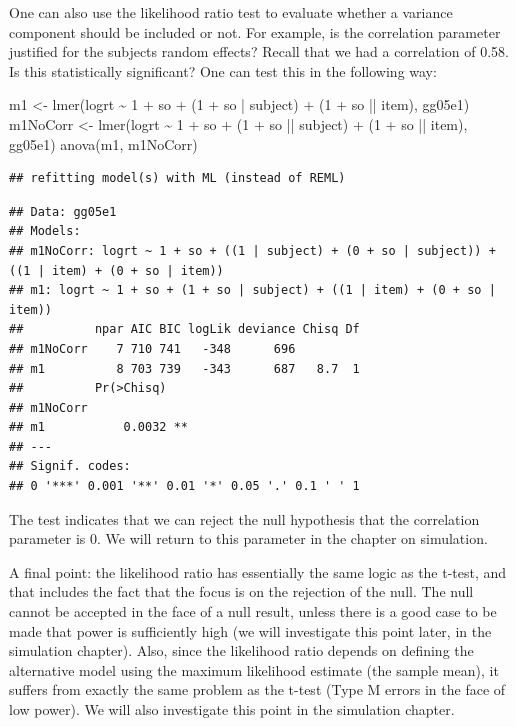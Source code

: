 \documentclass[
  12pt,
]{krantz}
\newenvironment{Shaded}{\begin{snugshade}}{\end{snugshade}}
\newcommand{\DecValTok}[1]{\textcolor[rgb]{0.00,0.00,0.81}{#1}}
\newcommand{\FunctionTok}[1]{\textcolor[rgb]{0.00,0.00,0.00}{#1}}
\newcommand{\NormalTok}[1]{#1}
\newcommand{\OtherTok}[1]{\textcolor[rgb]{0.56,0.35,0.01}{#1}}
\newcommand{\SpecialCharTok}[1]{\textcolor[rgb]{0.00,0.00,0.00}{#1}}
\theoremstyle{definition}
\theoremstyle{definition}
\theoremstyle{definition}
\theoremstyle{definition}
\theoremstyle{remark}
\begin{document}
One can also use the likelihood ratio test to evaluate whether a variance component should be included or not. For example, is the correlation parameter justified for the subjects random effects? Recall that we had a correlation of 0.58. Is this statistically significant? One can test this in the following way:

\begin{Shaded}
\begin{Highlighting}[]
\NormalTok{m1 }\OtherTok{\textless{}{-}} \FunctionTok{lmer}\NormalTok{(logrt }\SpecialCharTok{\textasciitilde{}} \DecValTok{1} \SpecialCharTok{+}\NormalTok{ so }\SpecialCharTok{+}\NormalTok{ (}\DecValTok{1} \SpecialCharTok{+}\NormalTok{ so }\SpecialCharTok{|}\NormalTok{ subject) }\SpecialCharTok{+}\NormalTok{ (}\DecValTok{1} \SpecialCharTok{+}\NormalTok{ so }\SpecialCharTok{||}\NormalTok{ item), gg05e1)}
\NormalTok{m1NoCorr }\OtherTok{\textless{}{-}} \FunctionTok{lmer}\NormalTok{(logrt }\SpecialCharTok{\textasciitilde{}} \DecValTok{1} \SpecialCharTok{+}\NormalTok{ so }\SpecialCharTok{+}\NormalTok{ (}\DecValTok{1} \SpecialCharTok{+}\NormalTok{ so }\SpecialCharTok{||}\NormalTok{ subject) }\SpecialCharTok{+}\NormalTok{ (}\DecValTok{1} \SpecialCharTok{+}\NormalTok{ so }\SpecialCharTok{||}\NormalTok{ item), gg05e1)}
\FunctionTok{anova}\NormalTok{(m1, m1NoCorr)}
\end{Highlighting}
\end{Shaded}

\begin{verbatim}
## refitting model(s) with ML (instead of REML)
\end{verbatim}

\begin{verbatim}
## Data: gg05e1
## Models:
## m1NoCorr: logrt ~ 1 + so + ((1 | subject) + (0 + so | subject)) + ((1 | item) + (0 + so | item))
## m1: logrt ~ 1 + so + (1 + so | subject) + ((1 | item) + (0 + so | item))
##          npar AIC BIC logLik deviance Chisq Df
## m1NoCorr    7 710 741   -348      696         
## m1          8 703 739   -343      687   8.7  1
##          Pr(>Chisq)   
## m1NoCorr              
## m1           0.0032 **
## ---
## Signif. codes:  
## 0 '***' 0.001 '**' 0.01 '*' 0.05 '.' 0.1 ' ' 1
\end{verbatim}

The test indicates that we can reject the null hypothesis that the correlation parameter is 0. We will return to this parameter in the chapter on simulation.

A final point: the likelihood ratio has essentially the same logic as the t-test, and that includes the fact that the focus is on the rejection of the null. The null cannot be accepted in the face of a null result, unless there is a good case to be made that power is sufficiently high (we will investigate this point later, in the simulation chapter). Also, since the likelihood ratio depends on defining the alternative model using the maximum likelihood estimate (the sample mean), it suffers from exactly the same problem as the t-test (Type M errors in the face of low power). We will also investigate this point in the simulation chapter.
\end{document}
